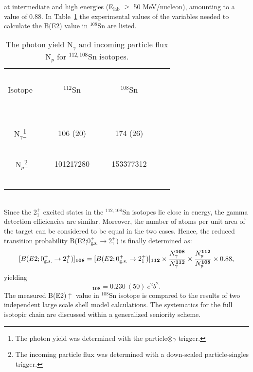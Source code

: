 \documentclass[aps,prc,twocolumn,amssymb,showpacs]{revtex4}
\begin{document}
at intermediate and high energies (E$_{\text{lab}}$ $\geqslant$ 50
MeV/nucleon), amounting to a value of 0.88. In Table~\ref{tab-1}
the experimental values of the variables needed to calculate the
B(E2) value in $^{108}$Sn are listed. \vspace{-10pt}
\begin{table}[!h]
\caption{The photon yield N$_{\gamma}$ and incoming particle flux
N$_{p}$ for $^{112,108}$Sn isotopes.}\label{tab-1}
\begin{tabular}[t]{cccc}
\hline \hline
           &               &              &  ~~~ \\
Isotope ~~~& $^{112}$Sn ~~~& $^{108}$Sn   &  ~~~ \\
           &               &              &  ~~~ \\
\hline \hline
           &               &              &  ~~~ \\
N$_{\gamma}$\footnote{\vspace{5pt}The photon yield was determined with the particle$\otimes$$\gamma$ trigger.} ~~~& 106 (20) ~~~ & 174 (26) &  ~~~ \\
           &               &              &  ~~~ \\
N$_{p}$\footnote{The incoming particle flux was determined with a down-scaled particle-singles trigger.}~~~& 101217280  ~~~ & 153377312  &  ~~~ \\
           &               &              &  ~~~ \\
\hline \hline \vspace{1pt}
\end{tabular}
\end{table}\\
Since the 2$^+_1$ excited states in the $^{112,108}$Sn isotopes
lie close in energy, the gamma detection efficiencies are similar.
Moreover, the number of atoms per unit area of the target can be
considered to be equal in the two cases. Hence, the reduced
transition probability
B(E2;0$^+_{\text{g.s.}}$$\rightarrow$2$^+_1$) is finally
determined as:
\begin{displaymath}
\scriptsize
[B(E2;0^+_{\text{g.s.}}\rightarrow2^+_1)]_{\textbf{108}} =
[B(E2;0^+_{\text{g.s.}}\rightarrow2^+_1)]_{\textbf{112}}\times\frac{N^{\textbf{108}}_{\gamma}}{N^{\textbf{112}}_{\gamma}}
\times\frac{N^{\textbf{112}}_p}{N^{\textbf{108}}_p}\times0.88,
\end{displaymath}
yielding
\begin{displaymath}
[B(E2;0^+_{\text{g.s.}}\rightarrow2^+_1)]_{\textbf{108}} = 0.230\
(50)\ e^2b^2.
\end{displaymath}The measured B(E2)$\uparrow$ value in
$^{108}$Sn isotope is compared to the results of two independent
large scale shell model calculations. The systematics for the full
isotopic chain are discussed within a generalized seniority scheme.\\
\end{document}
